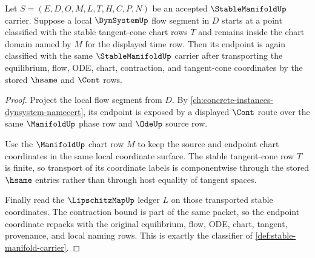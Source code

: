 \begin{theorem}
\label{thm:stable-manifold-flow-invariance}
Let $S=(E,D,O,M,L,T,H,C,P,N)$ be an accepted $\StableManifoldUp$ carrier.
Suppose a local $\DynSystemUp$ flow segment in $D$ starts at a point classified
with the stable tangent-cone chart rows $T$ and remains inside the chart domain
named by $M$ for the displayed time row. Then its endpoint is again classified
with the same $\StableManifoldUp$ carrier after transporting the equilibrium,
flow, ODE, chart, contraction, and tangent-cone coordinates by the stored
$\hsame$ and $\Cont$ rows.
\end{theorem}
\begin{proof}
Project the local flow segment from $D$. By
\autoref{ch:concrete-instances-dynsystem-namecert}, its endpoint is exposed by
a displayed $\Cont$ route over the same $\ManifoldUp$ phase row and
$\OdeUp$ source row.

Use the $\ManifoldUp$ chart row $M$ to keep the source and endpoint chart
coordinates in the same local coordinate surface. The stable tangent-cone row
$T$ is finite, so transport of its coordinate labels is componentwise through
the stored $\hsame$ entries rather than through host equality of tangent
spaces.

Finally read the $\LipschitzMapUp$ ledger $L$ on those transported stable
coordinates. The contraction bound is part of the same packet, so the endpoint
coordinate repacks with the original equilibrium, flow, ODE, chart, tangent,
provenance, and local naming rows. This is exactly the classifier of
\autoref{def:stable-manifold-carrier}.
\end{proof}

